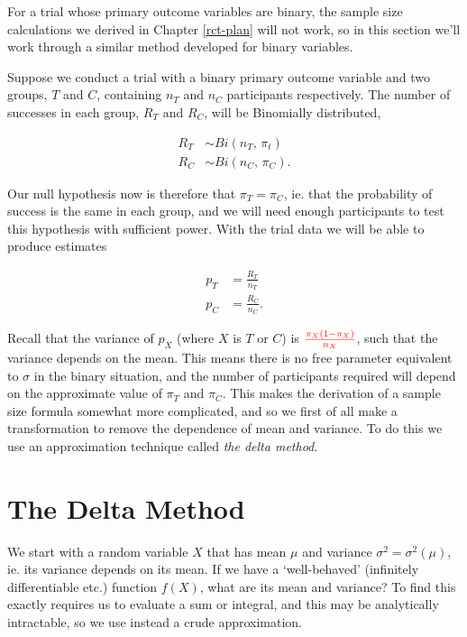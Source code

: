 \documentclass[
  openany]{book}
\theoremstyle{definition}
\theoremstyle{definition}
\theoremstyle{definition}
\theoremstyle{definition}
\theoremstyle{remark}
\begin{document}
For a trial whose primary outcome variables are binary, the sample size calculations we derived in Chapter \ref{rct-plan} will not work, so in this section we'll work through a similar method developed for binary variables.

Suppose we conduct a trial with a binary primary outcome variable and two groups, \(T\) and \(C\), containing \(n_T\) and \(n_C\) participants respectively. The number of successes in each group, \(R_T\) and \(R_C\), will be Binomially distributed,

\begin{align*}
      R_T &\sim{Bi\left(n_T,\, \pi_t\right)} \\
      R_C &\sim{Bi\left(n_C,\,\pi_C\right)}.
\end{align*}

Our null hypothesis now is therefore that \(\pi_T = \pi_C\), ie. that the probability of success is the same in each group, and we will need enough participants to test this hypothesis with sufficient power. With the trial data we will be able to produce estimates

\begin{align*}
      p_T & = \frac{R_T}{n_T} \\
      p_C & = \frac{R_C}{n_C}.
\end{align*}

Recall that the variance of \(p_X\) (where \(X\) is \(T\) or \(C\)) is \(\color{red}{\frac{\pi_X\left(1-\pi_X\right)}{n_X}}\), such that the variance depends on the mean. This means there is no free parameter equivalent to \(\sigma\) in the binary situation, and the number of participants required will depend on the approximate value of \(\pi_T\) and \(\pi_C\). This makes the derivation of a sample size formula somewhat more complicated, and so we first of all make a transformation to remove the dependence of mean and variance. To do this we use an approximation technique called \emph{the delta method}.

\hypertarget{delta-method}{%
\section{The Delta Method}\label{delta-method}}

We start with a random variable \(X\) that has mean \(\mu\) and variance \(\sigma^2 = \sigma^2\left(\mu\right)\), ie. its variance depends on its mean. If we have a `well-behaved' (infinitely differentiable etc.) function \(f\left(X\right)\), what are its mean and variance? To find this exactly requires us to evaluate a sum or integral, and this may be analytically intractable, so we use instead a crude approximation.
\end{document}
